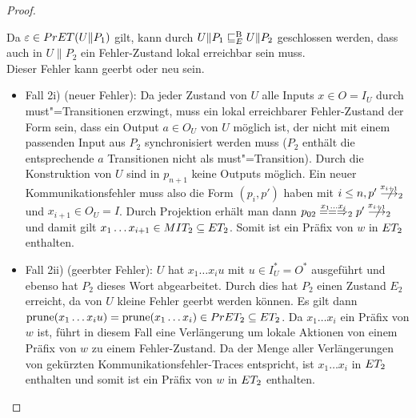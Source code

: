 \begin{proof}
\begin{itemize}
\begin{itemize}
      \end{itemize}
      Da $\varepsilon\in PrET (U\|P_1)$ gilt, kann durch $U\|P_1 \sqsubseteq  _E^\mathrm{B} U\|P_2$
      geschlossen werden, dass auch in $U\|P_2$ ein Fehler-Zustand lokal
      erreichbar sein muss.\\
      Dieser Fehler kann geerbt oder neu sein.
      \begin{itemize}
        \item Fall 2i) (neuer Fehler): Da jeder Zustand von $U$ alle Inputs
          $x\in O=I_U$ durch must"=Transitionen erzwingt, muss ein lokal
          erreichbarer Fehler-Zustand der Form sein, dass ein Output $a\in O_U$
          von $U$ möglich ist, der nicht mit einem passenden Input aus $P_2$
          synchronisiert werden muss ($P_2$ enthält die entsprechende $a$
          Transitionen nicht als must"=Transition). Durch die Konstruktion von
          $U$ sind in $p_{n+1}$ keine Outputs möglich. Ein neuer
          Kommunikationsfehler muss also die Form $(p_i,p')$ haben mit $i\leq
          n, p'\nmust[x_{i+1}]_2$ und $x_{i+1}\in O_U=I$. Durch Projektion
          erhält man dann $p_{02}\lweakmay[x_1\dots x_i]_2p'\nmust[x_{i+1}]_2$
          und damit gilt $x_1\dots x_{i+1}\in MIT _2\subseteq ET _2$. Somit
          ist ein Präfix von $w$ in $ET _2$ enthalten.
        \item Fall 2ii) (geerbter Fehler): $U$ hat $x_1\dots x_iu$ mit $u\in
          I_U^*=O^*$ ausgeführt und ebenso hat $P_2$ dieses Wort abgearbeitet.
          Durch dies hat $P_2$ einen Zustand $E_2$ erreicht, da von $U$ kleine
          Fehler geerbt werden können. Es gilt dann $\mathrm{prune} (x_1\dots x_iu) =
          \mathrm{prune} (x_1\dots x_i)\in PrET _2\subseteq ET _2$. Da $x_1\dots x_i$
          ein Präfix von $w$ ist, führt in diesem Fall eine Verlängerung um
          lokale Aktionen von einem Präfix von $w$ zu einem Fehler-Zustand. Da
          \ET{} der Menge aller Verlängerungen von gekürzten
          Kommunikationsfehler-Traces entspricht, ist $x_1\dots x_i$ in $ET
          _2$ enthalten und somit ist ein Präfix von $w$ in $ET _2$ enthalten.
      \end{itemize}
  \end{itemize}


\end{proof}
